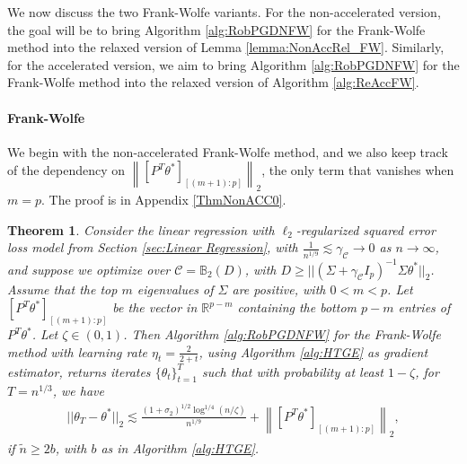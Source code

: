 \documentclass{article}
\newtheorem{theorem}{Theorem}
\begin{document}
We now discuss the two Frank-Wolfe variants. For the non-accelerated version, the goal will be to bring Algorithm \ref{alg:RobPGDNFW} for the Frank-Wolfe method into the relaxed version of Lemma \ref{lemma:NonAccRel_FW}. Similarly, for the accelerated version, we aim to bring Algorithm \ref{alg:RobPGDNFW} for the Frank-Wolfe method into the relaxed version of Algorithm \ref{alg:ReAccFW}.


\paragraph{Frank-Wolfe}

We begin with the non-accelerated Frank-Wolfe method, and we also keep track of the dependency on $\left\|[P^T\theta^*]_{[(m+1):p]}\right\|_2$, the only term that vanishes when $m = p$. The proof is in Appendix \ref{ThmNonACC0}.

\begin{theorem}
\label{theorem:NonACC_lambda=0}
Consider the linear regression with $\ell_2$-regularized squared error loss model from Section \ref{sec:Linear Regression}, with $\frac{1}{n^{1/9}} \lesssim \gamma_{\mathcal{C}} \rightarrow 0$ as $n \rightarrow \infty$, and suppose we optimize over $\mathcal{C} = \mathbb{B}_2\left(D\right)$, with $D \geq ||(\Sigma + \gamma_{\mathcal{C}}I_p)^{-1}\Sigma\theta^*||_2$. Assume that the top $m$ eigenvalues of $\Sigma$ are positive, with $0 < m < p$. Let $[P^T\theta^*]_{[(m + 1):p]}$ be the vector in $\mathbb{R}^{p-m}$ containing the bottom $p-m$ entries of $P^T\theta^*$. Let $\zeta \in (0, 1)$. Then Algorithm \ref{alg:RobPGDNFW} for the Frank-Wolfe method with learning rate $\eta_t = \frac{2}{2 + t}$, using Algorithm \ref{alg:HTGE} as gradient estimator, returns iterates $\{\theta_t\}_{t = 1}^T$ such that with probability at least $1 - \zeta$, for $T = n^{1/3}$, we have
\begin{align*}
||\theta_T - \theta^*||_2 \lesssim \frac{(1 + \sigma_2)^{1/2}\log^{1/4}(n/\zeta)}{n^{1/9}} + \left\|[P^T\theta^*]_{[(m+1):p]}\right\|_2,
\end{align*}
if $\widetilde{n} \geq 2b$, with $b$ as in Algorithm \ref{alg:HTGE}.
\end{theorem}
\end{document}
